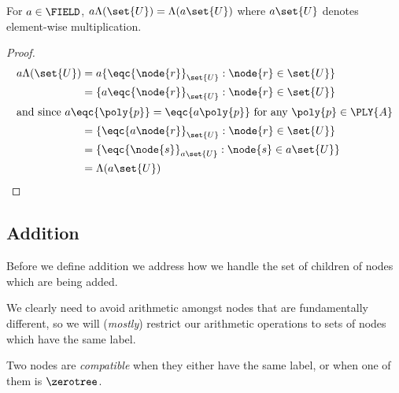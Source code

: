 \begin{proposition}\label{sLambda}
  For $a \in \FIELD$, $a \Lambda(\set{U}) = \Lambda(a\set{U})$ where $a\set{U}$ denotes element-wise
  multiplication.
  \begin{proof}
    \begin{align*}
      a\Lambda(\set{U}) &= a \{\eqc{\node{r}}_{\set{U}}: \node{r}\in\set{U}\}\\ 
      &= \{a\eqc{\node{r}}_{\set{U}}: \node{r}\in\set{U}\}\\
      \intertext{and since  $a\eqc{\poly{p}} = \eqc{a\poly{p}}$ for
        any $\poly{p}\in\PLY{A}$}
      &= \{\eqc{a\node{r}}_{\set{U}}: \node{r}\in\set{U}\}\\
      &= \{\eqc{\node{s}}_{a\set{U}}: \node{s}\in a \set{U}\}\\
      &= \Lambda(a\set{U})
    \end{align*}
  \end{proof}
\end{proposition}

\subsection{Addition}
Before we define addition we address how we handle the set of children
of nodes which are being added.

We clearly need to avoid arithmetic amongst nodes that are
fundamentally different, so we will (\emph{mostly}) restrict our
arithmetic operations to sets of nodes which have the same label.
\begin{definition}
  Two nodes are \emph{compatible\/} when they either have the same label, or
  when one of them is $\zerotree$.
\end{definition}

